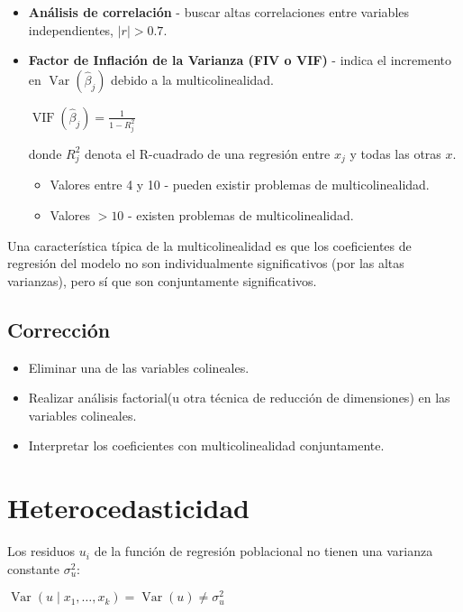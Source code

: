 \documentclass[10pt, a4paper, landscape]{article}
\DeclareMathOperator{\Var}{Var}
\begin{document}
\begin{multicols}{3}
\begin{itemize}[leftmargin=*]
	\item \textbf{Análisis de correlación} - buscar altas correlaciones entre variables independientes, \( \lvert r \rvert > 0.7 \).
	\item \textbf{Factor de Inflación de la Varianza (FIV o VIF)} - indica el incremento en \( \Var(\hat{\beta}_{j}) \) debido a la multicolinealidad.
	\begin{center}
		\( \operatorname{VIF}(\hat{\beta}_{j}) = \frac{1}{1 - R_{j}^{2}} \)
	\end{center}
	donde \( R_{j}^{2} \) denota el R-cuadrado de una regresión entre \( x_{j} \) y todas las otras \( x \).
	\begin{itemize}[leftmargin=*]
		\item Valores entre 4 y 10 - pueden existir problemas de multicolinealidad.
		\item Valores \( > 10 \) - existen problemas de multicolinealidad.
	\end{itemize}
\end{itemize}

Una característica típica de la multicolinealidad es que los coeficientes de regresión del modelo no son individualmente significativos (por las altas varianzas), pero sí que son conjuntamente significativos.

\subsection*{Corrección}

\begin{itemize}[leftmargin=*]
	\item Eliminar una de las variables colineales.
	\item Realizar análisis factorial(u otra técnica de reducción de dimensiones) en las variables colineales.
	\item Interpretar los coeficientes con multicolinealidad conjuntamente.
\end{itemize}

\columnbreak

\section*{Heterocedasticidad}

Los residuos \( u_{i} \) de la función de regresión poblacional no tienen una varianza constante \( \sigma_{u}^{2} \):

\begin{center}
	\( \Var(u \mid x_{1}, \ldots, x_{k}) = \Var(u) \neq \sigma_{u}^{2} \)
\end{center}


\end{multicols}
\end{document}
